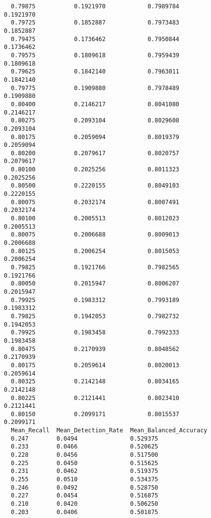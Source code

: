 \documentclass[
  letterpaper,
  DIV=11,
  numbers=noendperiod]{scrartcl}
\begin{document}
\begin{verbatim}
  0.79875           0.1921970            0.7989784            0.1921970     
  0.79725           0.1852887            0.7973483            0.1852887     
  0.79475           0.1736462            0.7950844            0.1736462     
  0.79575           0.1809618            0.7959439            0.1809618     
  0.79625           0.1842140            0.7963011            0.1842140     
  0.79775           0.1909880            0.7978489            0.1909880     
  0.80400           0.2146217            0.8041080            0.2146217     
  0.80275           0.2093104            0.8029608            0.2093104     
  0.80175           0.2059094            0.8019379            0.2059094     
  0.80200           0.2079617            0.8020757            0.2079617     
  0.80100           0.2025256            0.8011323            0.2025256     
  0.80500           0.2220155            0.8049103            0.2220155     
  0.80075           0.2032174            0.8007491            0.2032174     
  0.80100           0.2005513            0.8012023            0.2005513     
  0.80075           0.2006688            0.8009013            0.2006688     
  0.80125           0.2006254            0.8015053            0.2006254     
  0.79825           0.1921766            0.7982565            0.1921766     
  0.80050           0.2015947            0.8006207            0.2015947     
  0.79925           0.1983312            0.7993189            0.1983312     
  0.79825           0.1942053            0.7982732            0.1942053     
  0.79925           0.1983458            0.7992333            0.1983458     
  0.80475           0.2170939            0.8048562            0.2170939     
  0.80175           0.2059614            0.8020013            0.2059614     
  0.80325           0.2142148            0.8034165            0.2142148     
  0.80225           0.2121441            0.8023410            0.2121441     
  0.80150           0.2099171            0.8015537            0.2099171     
  Mean_Recall  Mean_Detection_Rate  Mean_Balanced_Accuracy
  0.247        0.0494               0.529375              
  0.233        0.0466               0.520625              
  0.228        0.0456               0.517500              
  0.225        0.0450               0.515625              
  0.231        0.0462               0.519375              
  0.255        0.0510               0.534375              
  0.246        0.0492               0.528750              
  0.227        0.0454               0.516875              
  0.210        0.0420               0.506250              
  0.203        0.0406               0.501875              

\end{verbatim}
\end{document}
